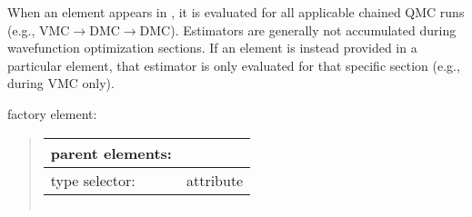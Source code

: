 \documentclass[letterpaper,10pt,english]{sphinxmanual}
\begin{document}
When an  element appears in , it is
evaluated for all applicable chained QMC runs (e.g.,
VMC\(\rightarrow\)DMC\(\rightarrow\)DMC). Estimators are
generally not accumulated during wavefunction optimization sections. If
an  element is instead provided in a particular
 element, that estimator is only evaluated for that specific
section (e.g., during VMC only).

 factory element:
\begin{quote}


\begin{savenotes}\sphinxattablestart
\centering
\begin{tabulary}{\linewidth}[t]{|T|T|}
\hline

parent elements:
&
\\
\hline
type selector:
&
 attribute
\\
\hline
\end{tabulary}
\par
\sphinxattableend\end{savenotes}


\begin{savenotes}\sphinxattablestart
\centering
\begin{tabulary}{\linewidth}[t]{|T|T|T|}
\hline


\end{tabulary}
\end{savenotes}
\end{quote}
\end{document}
